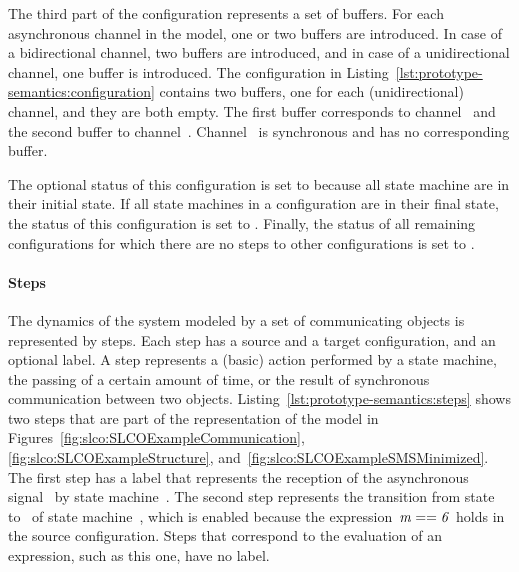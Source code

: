 The third part of the configuration represents a set of buffers.
For each asynchronous channel in the model, one or two buffers are introduced.
In case of a bidirectional channel, two buffers are introduced, and in case of a unidirectional channel, one buffer is introduced.
The configuration in Listing~\ref{lst:prototype-semantics:configuration} contains two buffers, one for each (unidirectional) channel, and they are both empty.
The first buffer corresponds to channel~ and the second buffer to channel~.
Channel~ is synchronous and has no corresponding buffer.

The optional status of this configuration is set to  because all state machine are in their initial state.
If all state machines in a configuration are in their final state, the status of this configuration is set to .
Finally, the status of all remaining configurations for which there are no steps to other configurations is set to .

\paragraph{Steps}
The dynamics of the system modeled by a set of communicating objects is represented by steps.
Each step has a source and a target configuration, and an optional label.
A step represents a (basic) action performed by a state machine, the passing of a certain amount of time, or the result of synchronous communication between two objects.
Listing~\ref{lst:prototype-semantics:steps} shows two steps that are part of the \CS representation of the \SLCO model in Figures~\ref{fig:slco:SLCOExampleCommunication}, \ref{fig:slco:SLCOExampleStructure}, and~\ref{fig:slco:SLCOExampleSMSMinimized}.
The first step has a label that represents the reception of the asynchronous signal~ by state machine~.
The second step represents the transition from state~ to~ of state machine~, which is enabled because the expression~$\it{m}==6$ holds in the source configuration.
Steps that correspond to the evaluation of an expression, such as this one, have no label.

